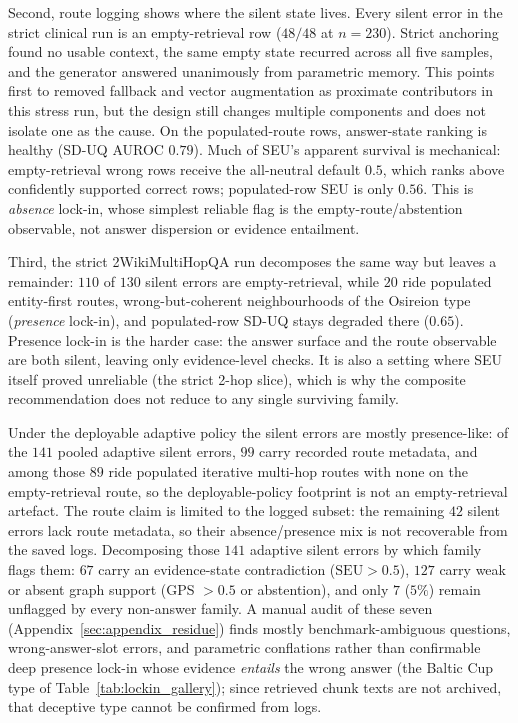 Second, route logging shows where the silent state lives.
Every silent error in the strict clinical run is an empty-retrieval row
($48/48$ at $n=230$).
Strict anchoring found no usable context, the same empty state recurred across
all five samples, and the generator answered unanimously from parametric
memory.
This points first to removed fallback and vector augmentation as proximate
contributors in this stress run, but the design still changes multiple
components and does not isolate one as the cause.
On the populated-route rows, answer-state ranking is healthy (SD-UQ AUROC
$0.79$).
Much of SEU's apparent survival is mechanical: empty-retrieval wrong rows
receive the all-neutral default $0.5$, which ranks above confidently supported
correct rows; populated-row SEU is only $0.56$.
This is \emph{absence} lock-in, whose simplest reliable flag is the
empty-route/abstention observable, not answer dispersion or evidence
entailment.

Third, the strict 2WikiMultiHopQA run decomposes the same way but leaves a
remainder: $110$ of $130$ silent errors are empty-retrieval, while $20$ ride
populated entity-first routes, wrong-but-coherent neighbourhoods of the
Osireion type (\emph{presence} lock-in), and populated-row SD-UQ stays
degraded there ($0.65$).
Presence lock-in is the harder case: the answer surface and the route
observable are both silent, leaving only evidence-level checks.
It is also a setting where SEU itself proved unreliable (the strict 2-hop
slice), which is why the composite recommendation does not reduce to any single
surviving family.

Under the deployable adaptive policy the silent errors are
mostly presence-like: of the $141$ pooled adaptive silent errors, $99$ carry
recorded route metadata, and among those $89$ ride populated iterative
multi-hop routes with none on the empty-retrieval route, so the
deployable-policy footprint is not an empty-retrieval artefact.
The route claim is limited to the logged subset: the remaining $42$ silent
errors lack route metadata, so their absence/presence mix is not recoverable
from the saved logs.
Decomposing those $141$ adaptive silent errors by which family flags them:
$67$ carry an evidence-state contradiction ($\mathrm{SEU}>0.5$), $127$ carry
weak or absent graph support (GPS $>0.5$ or abstention), and only $7$
($5\%$) remain unflagged by every non-answer family.
A manual audit of these seven (Appendix~\ref{sec:appendix_residue}) finds
mostly benchmark-ambiguous questions, wrong-answer-slot errors, and parametric
conflations rather than confirmable deep presence lock-in whose evidence
\emph{entails} the wrong answer (the Baltic Cup type of
Table~\ref{tab:lockin_gallery}); since retrieved chunk texts are not archived,
that deceptive type cannot be confirmed from logs.

